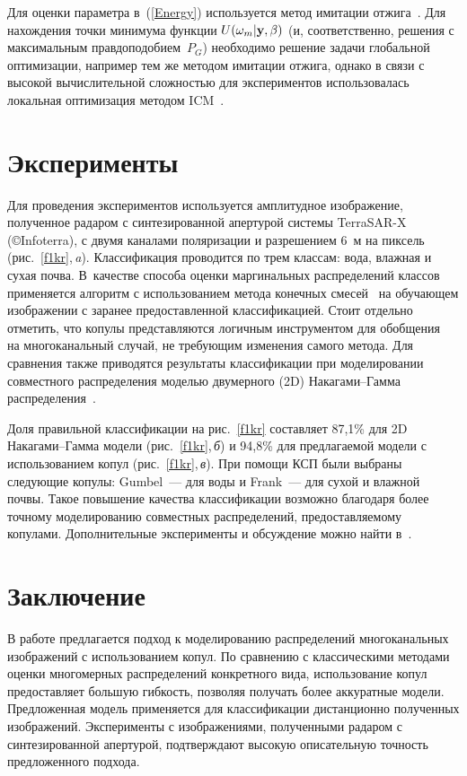 \begin{multicols}{2}
Для оценки параметра в~(\ref{Energy}) используется метод имитации отжига~\cite{MRFaccelerated}. 
Для нахождения точки минимума функции
$U(\omega_m|{\bf y},\beta)$ (и, соответственно, решения с максимальным правдоподобием~$P_{G}$)
необходимо решение задачи глобальной оптимизации, например тем же методом имитации отжига, 
однако в связи с высокой вычислительной сложностью для экспериментов
использовалась локальная оптимизация методом ICM~\cite{Besag}.

\vspace*{-12pt}

\section{Эксперименты}

Для проведения экспериментов используется амплитудное изображение,
полученное радаром с синтезированной апертурой системы TerraSAR-X
(\copyright Infoterra), с двумя каналами поляризации и разрешением 6~м на пиксель 
(рис.~\ref{f1kr},\,\textit{a}). Классификация проводится по трем
классам: вода, влажная и сухая почва. В~качестве способа оценки
маргинальных распределений классов применяется алгоритм с
использованием метода конечных смесей~\cite{KrylovSPIE09} на
обучающем изображении с заранее предоставленной классификацией.
Стоит отдельно отметить, что копулы представляются логичным
инструментом для обобщения~\cite{KrylovSPIE09} на многоканальный
случай, не требующим изменения самого метода. Для сравнения также
приводятся результаты классификации при моделировании совместного
распределения моделью двумерного (2D) На\-ка\-га\-ми--Гам\-ма
распределения~\cite{2DNG}.



Доля правильной классификации на рис.~\ref{f1kr} составляет 87,1\% для 2D
На\-ка\-га\-ми--Гам\-ма модели (рис.~\ref{f1kr},\,\textit{б}) и 94,8\% для предлагаемой модели с
использованием копул (рис.~\ref{f1kr},\,\textit{в}). При помощи КСП были выбраны
следующие копулы: Gumbel~--- для воды и Frank~--- для сухой и влажной
почвы. Такое повышение качества классификации возможно благодаря
более точному моделированию совместных распределений,
предоставляемому копулами. Дополнительные эксперименты и обсуждение
можно найти в~\cite{KrylovRR09}.

\section{Заключение}


В работе предлагается подход к моделированию распределений многоканальных изображений с использованием копул.
По сравнению с классическими методами оценки многомерных распределений конкретного вида, использование копул 
предос\-тав\-ля\-ет большую гибкость, позволяя получать более аккуратные модели.
Предложенная модель применяется для классификации дистанционно полученных изображений.
Эксперименты с изображениями, полученными радаром с синтезированной апертурой, подтверждают 
высокую описательную точность предложенного подхода.


\end{multicols}
